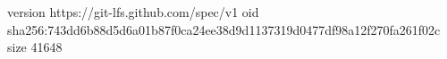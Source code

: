 version https://git-lfs.github.com/spec/v1
oid sha256:743dd6b88d5d6a01b87f0ca24ee38d9d1137319d0477df98a12f270fa261f02c
size 41648
